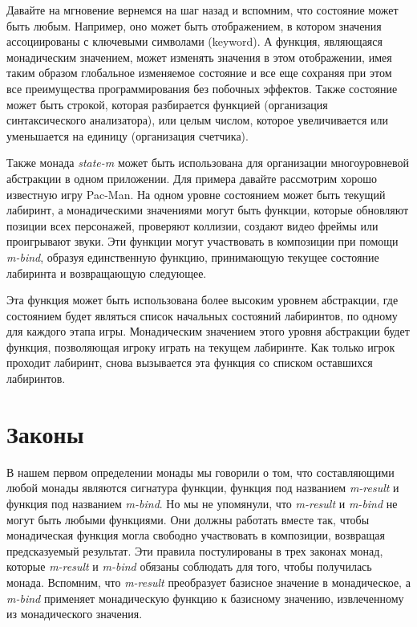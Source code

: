 \documentclass[a4paper,12pt]{article}
\newcommand{\cl}[1] {{\it #1}}
\begin{document}
Давайте на мгновение вернемся на шаг назад и вспомним, что состояние может быть любым. Например, оно может быть
отображением, в котором значения ассоциированы с ключевыми символами (keyword). А функция, являющаяся
монадическим значением, может изменять значения в этом отображении, имея таким образом глобальное изменяемое
состояние и все еще сохраняя при этом все преимущества программирования без побочных эффектов. 
Также состояние может быть строкой, которая разбирается функцией (организация
синтаксического анализатора), или целым числом, которое увеличивается или уменьшается на единицу (организация счетчика).

Также монада \cl{state-m} может быть использована для организации многоуровневой абстракции в одном приложении.
Для примера давайте рассмотрим хорошо известную игру Pac-Man. На одном уровне состоянием может быть
текущий лабиринт, а монадическими значениями могут быть функции, которые обновляют позиции всех персонажей,
проверяют коллизии, создают видео фреймы или проигрывают звуки. Эти функции могут участвовать в композиции
при помощи \cl{m-bind}, образуя единственную функцию, принимающую текущее состояние лабиринта и возвращающую следующее.

Эта функция может быть использована более высоким уровнем абстракции, где состоянием будет являться
список начальных состояний лабиринтов, по одному для каждого этапа игры. Монадическим значением 
этого уровня абстракции будет функция, позволяющая игроку играть на текущем лабиринте. Как только
игрок проходит лабиринт, снова вызывается эта функция со списком оставшихся лабиринтов. 


\section{Законы}\label{Legalities}
В нашем первом определении монады мы говорили о том, что составляющими любой монады являются
сигнатура функции, функция под названием \cl{m-result} и функция под названием \cl{m-bind}. 
Но мы не упомянули, что \cl{m-result} и \cl{m-bind} не могут быть любыми функциями. Они должны работать
вместе так, чтобы монадическая функция могла свободно участвовать в композиции, возвращая 
предсказуемый результат. Эти правила постулированы в трех законах монад, которые \cl{m-result} и \cl{m-bind}
обязаны соблюдать для того, чтобы получилась монада. Вспомним, что \cl{m-result} преобразует 
базисное значение в монадическое, а \cl{m-bind} применяет монадическую функцию к базисному значению, извлеченному
из монадического значения. 
\end{document}

